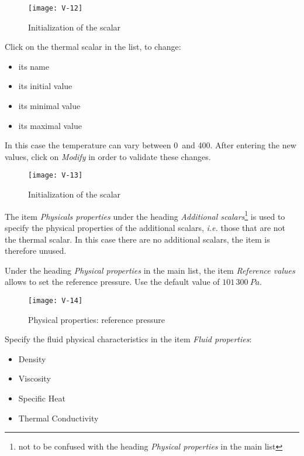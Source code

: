 \begin{figure}[ht]
\begin{center}
\texttt{[image: V-12]}
\caption{Initialization of the scalar}
\label{fig15_e1}
\end{center}
\end{figure}


\clearpage
Click on the thermal scalar in the list, to change:
\begin{itemize}
        \item its name
        \item its initial value
        \item its minimal value
        \item its maximal value
\end{itemize}
In this case the temperature can vary between 0\degresC\ and 400\degresC.
After entering the new values, click on {\itshape Modify} in order to validate
these changes.

\begin{figure}[ht]
\begin{center}
\texttt{[image: V-13]}
\caption{Initialization of the scalar}
\label{fig16_e1}
\end{center}
\end{figure}

The item {\itshape Physicals properties} under the heading {\itshape Additional
scalars}\footnote{not to be confused with the heading {\itshape Physical
properties} in the main list} is used to specify the physical properties
of the additional scalars, {\em i.e.} those that are not the thermal scalar. In
this case there are no additional scalars, the item is therefore unused.


\clearpage
Under the heading {\itshape Physical properties} in the main list,
the item {\itshape Reference values} allows to set the reference pressure.
Use the default value of $101\,300\ Pa$.

\begin{figure}[ht]
\begin{center}
\texttt{[image: V-14]}
\caption{Physical properties: reference pressure}
\label{fig17_e1}
\end{center}
\end{figure}


\clearpage
Specify the fluid physical characteristics in the item {\itshape Fluid
properties}:
\begin{itemize}
        \item Density
        \item Viscosity
        \item Specific Heat
        \item Thermal Conductivity
\end{itemize}

